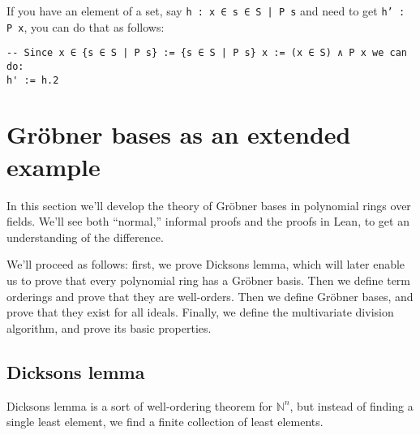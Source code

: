 \documentclass[a4paper, 12pt]{article}
\newcommand{\N}{\mathbb{N}}
\newcommand{\lean}[1]{\texttt{#1}}
\theoremstyle{changedot}
\theoremstyle{changedotbreak}
\theoremstyle{nonumberplain}
\begin{document}
If you have an element of a set, say \texttt{h : x ∈ {s ∈ S | P s}} and need to get \lean{h' : P x}, you can do that as follows:

\begin{verbatim}
-- Since x ∈ {s ∈ S | P s} := {s ∈ S | P s} x := (x ∈ S) ∧ P x we can do:
h' := h.2
\end{verbatim}



\section{Gröbner bases as an extended example}
In this section we'll develop the theory of Gröbner bases in polynomial rings over fields. We'll see both ``normal,'' informal proofs and the proofs in Lean, to get an understanding of the difference.

We'll proceed as follows: first, we prove Dicksons lemma, which will later enable us to prove that every polynomial ring has a Gröbner basis. Then we define term orderings and prove that they are well-orders. Then we define Gröbner bases, and prove that they exist for all ideals. Finally, we define the multivariate division algorithm, and prove its basic properties.

\subsection{Dicksons lemma}
Dicksons lemma is a sort of well-ordering theorem for $\N^{n}$, but instead of finding a single least element, we find a finite collection of least elements.
\end{document}
